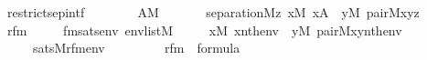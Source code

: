 \begin{isabellebody}
%
\isadelimproof
\isanewline
%
\endisadelimproof
\isanewline
\isanewline
{}\isamarkupfalse%
\ restrict{\isacharunderscore}{\kern0pt}sep{\isacharunderscore}{\kern0pt}intf\ {\isacharcolon}{\kern0pt}\isanewline
\ \ \isanewline
\ \ \ \ {\isachardoublequoteopen}A{\isasymin}M{\isachardoublequoteclose}\isanewline
\ \ \isanewline
\ \ \ \ {\isachardoublequoteopen}separation{\isacharparenleft}{\kern0pt}{\isacharhash}{\kern0pt}{\isacharhash}{\kern0pt}M{\isacharcomma}{\kern0pt}{\isasymlambda}z{\isachardot}{\kern0pt}\ {\isasymexists}x{\isasymin}M{\isachardot}{\kern0pt}\ x{\isasymin}A\ {\isacharampersand}{\kern0pt}\ {\isacharparenleft}{\kern0pt}{\isasymexists}y{\isasymin}M{\isachardot}{\kern0pt}\ pair{\isacharparenleft}{\kern0pt}{\isacharhash}{\kern0pt}{\isacharhash}{\kern0pt}M{\isacharcomma}{\kern0pt}x{\isacharcomma}{\kern0pt}y{\isacharcomma}{\kern0pt}z{\isacharparenright}{\kern0pt}{\isacharparenright}{\kern0pt}{\isacharparenright}{\kern0pt}{\isachardoublequoteclose}\isanewline
%
\isadelimproof
%
\endisadelimproof
%
\isatagproof
{}\isamarkupfalse%
\ {\isacharminus}{\kern0pt}\isanewline
\ \ \isamarkupfalse%
\ rfm\ \isanewline
\ \ \ \ fmsats{\isacharcolon}{\kern0pt}{\isachardoublequoteopen}{\isasymAnd}env{\isachardot}{\kern0pt}\ env{\isasymin}list{\isacharparenleft}{\kern0pt}M{\isacharparenright}{\kern0pt}\ {\isasymLongrightarrow}\isanewline
\ \ \ \ {\isacharparenleft}{\kern0pt}{\isasymexists}x{\isasymin}M{\isachardot}{\kern0pt}\ x{\isasymin}nth{\isacharparenleft}{\kern0pt}{}{\isacharcomma}{\kern0pt}env{\isacharparenright}{\kern0pt}\ {\isacharampersand}{\kern0pt}\ {\isacharparenleft}{\kern0pt}{\isasymexists}y{\isasymin}M{\isachardot}{\kern0pt}\ pair{\isacharparenleft}{\kern0pt}{\isacharhash}{\kern0pt}{\isacharhash}{\kern0pt}M{\isacharcomma}{\kern0pt}x{\isacharcomma}{\kern0pt}y{\isacharcomma}{\kern0pt}nth{\isacharparenleft}{\kern0pt}{}{\isacharcomma}{\kern0pt}env{\isacharparenright}{\kern0pt}{\isacharparenright}{\kern0pt}{\isacharparenright}{\kern0pt}{\isacharparenright}{\kern0pt}\isanewline
\ \ \ \ {\isasymlongleftrightarrow}\ sats{\isacharparenleft}{\kern0pt}M{\isacharcomma}{\kern0pt}rfm{\isacharparenleft}{\kern0pt}{}{\isacharcomma}{\kern0pt}{}{\isacharparenright}{\kern0pt}{\isacharcomma}{\kern0pt}env{\isacharparenright}{\kern0pt}{\isachardoublequoteclose}\isanewline
\ \ \ \ \isanewline
\ \ \ \ {\isachardoublequoteopen}rfm{\isacharparenleft}{\kern0pt}{}{\isacharcomma}{\kern0pt}{}{\isacharparenright}{\kern0pt}\ {\isasymin}\ formula{\isachardoublequoteclose}\isanewline

\end{isabellebody}
